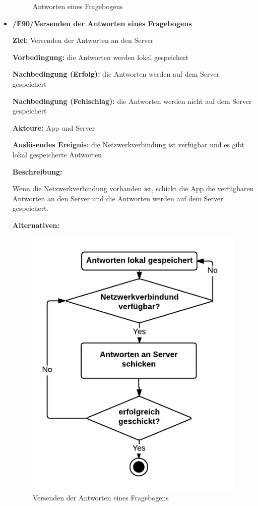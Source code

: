 \documentclass[a4paper]{scrreprt}
\begin{document}
\begin{itemize}
\begin{figure}[ht]
            		\caption{Antworten eines Fragebogens}
            	\end{figure}
            	

            \item \textbf{/F90/Versenden der Antworten eines Fragebogens}

            \par \textbf{Ziel: }Versenden der Antworten an den Server
            \par \textbf{Vorbedingung: }die Antworten werden lokal gespeichert
            \par \textbf{Nachbedingung (Erfolg): }die Antworten werden auf dem Server gespeichert
            \par \textbf{Nachbedingung (Fehlschlag): }die Antworten werden nicht auf dem Server gespeichert
            \par \textbf{Akteure: }App und Server
            \par \textbf{Auslösendes Ereignis: }die Netzwerkverbindung ist verfügbar und es gibt lokal gespeicherte Antworten
            \par \textbf{Beschreibung: }
            \par Wenn die Netzwerkverbindung vorhanden ist, schickt die App die verfügbaren Antworten an den Server und die Antworten werden auf dem Server gespeichert.
            \par \textbf{Alternativen: }
            \begin{figure}[ht]
            	\centering
            	\includegraphics[scale=1.2]{AppVersenden.jpeg}
            	\caption{Versenden der Antworten eines Fragebogens}
            \end{figure}
            

\end{itemize}
\end{document}

